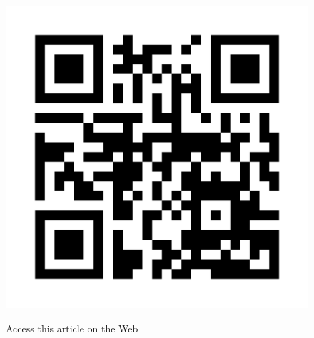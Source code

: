\begin{figure}[H]
\centering
\includegraphics{src/Figures/authentication_QR.jpg}

\medskip

{\large\sf Access this article on the Web}
\end{figure}

